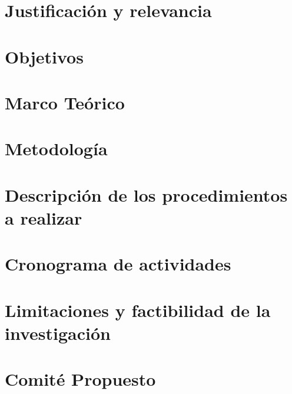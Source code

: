 \documentclass[10pt,letterpaper]{report}
\begin{document}
\chapter{Justificación y relevancia}

\chapter{Objetivos}

\chapter{Marco Teórico}

\chapter{Metodología}

\chapter{Descripción de los procedimientos a realizar}

\chapter{Cronograma de actividades}

\chapter{Limitaciones y factibilidad de la investigación}

\chapter{Comité Propuesto}

\printbibliography[title={Referencias}]
\end{document}
